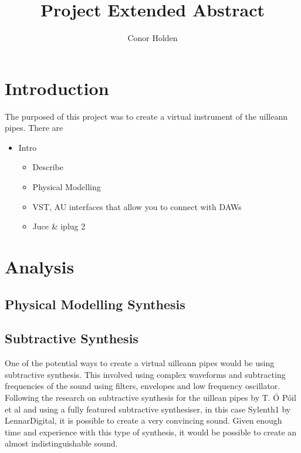 \documentclass[12pt]{article}
\title{Project Extended Abstract}
\author{Conor Holden }
\begin{document}
	
	\maketitle
		
		
		
\section{Introduction}

	The purposed of this project was to create a virtual instrument of the uilleann pipes. There are
	
	\begin{itemize}
		
		\item Intro
			\begin{itemize}
				\item Describe 
			\end{itemize}
		
		
			\begin{itemize}
				\item Physical Modelling
				\item VST, AU interfaces that allow you to connect with DAWs
				\item Juce \& iplug 2
			\end{itemize}
		
	\end{itemize}

\section{Analysis}

	\subsection{Physical Modelling Synthesis}
 	

	\subsection{Subtractive Synthesis}
	
	One of the potential ways to create a virtual uilleann pipes would be using subtractive synthesis. This involved using complex
	waveforms and subtracting frequencies of the sound using filters, envelopes and low frequency oscillator. Following the
	research on subtractive synthesis for the uillean pipes by T. Ó Póil et al and using a fully featured subtractive synthesiser,
	in this case Sylenth1 by LennarDigital, it is possible to create a very convincing sound. Given enough time and experience with
	this type of synthesis, it would be possible to create an almost indistinguishable sound.
	
\end{document}
